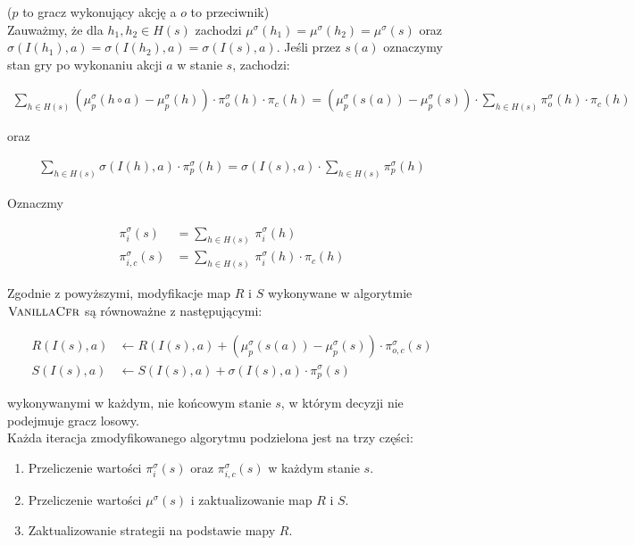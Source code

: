 \documentclass[magisterska]{pracamgr}
\begin{document}
\noindent
($p$ to gracz wykonujący akcję a $o$ to przeciwnik) \\

\noindent
Zauważmy, że dla $h_1, h_2 \in H(s)$ zachodzi $\mu^{\sigma}(h_1) = \mu^{\sigma}(h_2) = \mu^{\sigma}(s)$ oraz
$\sigma(I(h_1), a) = \sigma(I(h_2), a) = \sigma(I(s), a). $
Jeśli przez $s(a)$ oznaczymy stan gry po wykonaniu akcji $a$ w stanie $s$, zachodzi: 

\begin{align*}
\sum\limits_{h \in H(s)} (\mu_p^{\sigma}(h \circ a) - \mu_p^{\sigma}(h)) \cdot \pi_o^{\sigma}(h) \cdot \pi_c(h) =
(\mu_p^{\sigma}(s(a)) - \mu_p^{\sigma}(s)) \cdot \sum\limits_{h \in H(s)} \pi_o^{\sigma}(h) \cdot \pi_c(h)
\end{align*}

\noindent
oraz

\begin{align*}
\sum\limits_{h \in H(s)} \sigma(I(h), a) \cdot \pi_p^{\sigma}(h) =
\sigma(I(s), a) \cdot \sum\limits_{h \in H(s)} \pi_p^{\sigma}(h)
\end{align*}

\noindent
Oznaczmy

\begin{align*}
\pi_i^{\sigma}(s) &= \sum\limits_{h \in H(s)} \, \pi_i^{\sigma}(h) \\
\pi_{i,c}^{\sigma}(s) &= \sum\limits_{h \in H(s)} \, \pi_i^{\sigma}(h) \cdot \pi_c(h)
\end{align*}

\noindent
Zgodnie z powyższymi, modyfikacje map $R$ i $S$ wykonywane w algorytmie $\Call{VanillaCfr}{}$ są
równoważne z następującymi:

\begin{align*}
R(I(s), a) &\leftarrow R(I(s), a) + (\mu_p^{\sigma}(s(a)) - \mu_p^{\sigma}(s)) \cdot \pi_{o,c}^{\sigma}(s) \\
S(I(s), a) &\leftarrow S(I(s), a) + \sigma(I(s), a) \cdot \pi_p^{\sigma}(s)
\end{align*}

\noindent
wykonywanymi w każdym, nie końcowym stanie $s$, w którym decyzji nie podejmuje gracz losowy. \\

\noindent
Każda iteracja zmodyfikowanego algorytmu podzielona jest na trzy części:
\begin{enumerate}
\item Przeliczenie wartości $\pi_i^{\sigma}(s)$ oraz $\pi_{i, c}^{\sigma}(s)$ w każdym stanie $s$.
\item Przeliczenie wartości $\mu^{\sigma}(s)$ i zaktualizowanie map $R$ i $S$.
\item Zaktualizowanie strategii na podstawie mapy $R$.
\end{enumerate}
\end{document}
